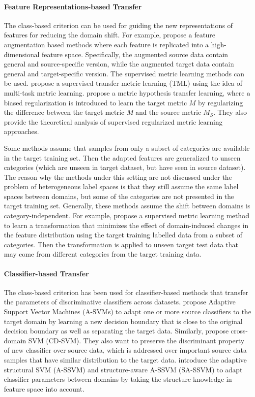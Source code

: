 \documentclass[prodmode]{acmsmall}  %
\begin{document}
\paragraph{Feature Representations-based Transfer}
The class-based criterion can be used for guiding the new representations of features for reducing the domain shift. For example,  propose a feature augmentation based methods where each feature is replicated into a high-dimensional feature space. Specifically, the augmented source data contain general and source-specific version, while the augmented target data contain general and target-specific version.
The supervised metric learning methods can be used.  propose a supervised transfer metric learning (TML) using the idea of multi-task metric learning.  
 propose a metric hypothesis transfer learning, where a biased regularization is introduced to learn the target metric $M$ by regularizing the difference between the target metric $M$ and the source metric $M_S$. They also provide the theoretical analysis of supervised regularized metric learning approaches.

Some methods assume that samples from only a subset of categories are available in the target training set. Then the adapted features are generalized to unseen categories (which are unseen in target dataset, but have seen in source dataset). The reason why the methods under this setting are not discussed under the problem of heterogeneous label spaces is that they still assume the same label spaces between domains, but some of the categories are not presented in the target training set. Generally, these methods assume the shift between domains is category-independent.
For example,  propose a supervised metric learning method to learn a transformation that minimizes the effect of domain-induced changes in the feature distribution using the target training labelled data from a subset of categories. Then the transformation is applied to unseen target test data that may come from different categories from the target training data.

\paragraph{Classifier-based Transfer}
The class-based criterion has been used for classifier-based methods that transfer the parameters of discriminative classifiers across datasets.  propose Adaptive Support Vector Machines (A-SVMs) to adapt one or more source classifiers to the target domain by learning a new decision boundary that is close to the original decision boundary as well as separating the target data. Similarly,  propose cross-domain SVM (CD-SVM). They also want to preserve the discriminant property of new classifier over source data, which is addressed over important source data samples that have similar distribution to the target data.  introduce the adaptive structural SVM (A-SSVM) and structure-aware A-SSVM (SA-SSVM) to adapt classifier parameters between domains by taking the structure knowledge in feature space into account. 
\end{document}
